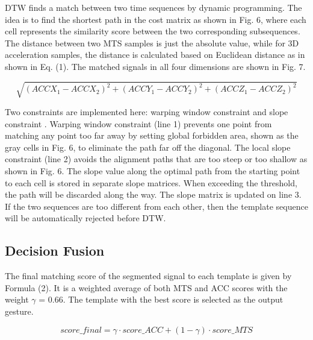 DTW finds a match between two time sequences by dynamic
programming. The idea is to find the shortest path in the
cost matrix as shown in Fig. 6, where each cell represents the
similarity score between the two corresponding subsequences.
The distance between two MTS samples is just the absolute
value, while for 3D acceleration samples, the distance is
calculated based on Euclidean distance as in shown in Eq. (1).
The matched signals in all four dimensions are shown in Fig. 7.

\begin{tiny}
\begin{equation}
\sqrt{(ACCX_1 - ACCX_2)^2 + (ACCY_1 - ACCY_2)^2 + (ACCZ_1 - ACCZ_2)^2}
\end{equation}
\end{tiny}

Two constraints are implemented here: warping window
constraint and slope constraint \cite{c11}. Warping window constraint
(line 1) prevents one point from matching any point
too far away by setting global forbidden area, shown as the
gray cells in Fig. 6, to eliminate the path far off the diagonal.
The local slope constraint (line 2) avoids the alignment paths
that are too steep or too shallow as shown in Fig. 6. The
slope value along the optimal path from the starting point to
each cell is stored in separate slope matrices. When exceeding
the threshold, the path will be discarded along the way. The
slope matrix is updated on line 3. If the two sequences are too
different from each other, then the template sequence will be
automatically rejected before DTW.
\subsection{Decision Fusion}
The final matching score of the segmented signal to each
template is given by Formula (2). It is a weighted average
of both MTS and ACC scores with the weight $\gamma$ = 0.66. The
template with the best score is selected as the output gesture.

\begin{small}
\begin{equation}
score\_final = \gamma\cdot score\_ACC+(1-\gamma)\cdot score\_MTS
\end{equation}
\end{small}